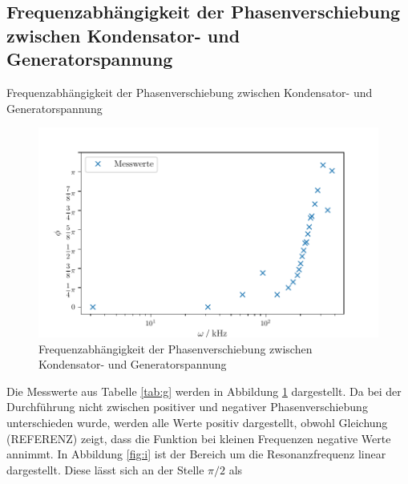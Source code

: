 \subsection{Frequenzabhängigkeit der Phasenverschiebung zwischen Kondensator- und Generatorspannung}

\begin{table}[H]
  \centering
  
  
  \caption{Frequenzabhängigkeit der Phasenverschiebung zwischen Kondensator- und Generatorspannung}
  \label{tab:g}
\end{table}

\begin{figure}[H]
  \centering
  \includegraphics{build/plot4.pdf}
  \caption{Frequenzabhängigkeit der Phasenverschiebung zwischen Kondensator- und Generatorspannung}
  \label{fig:j}
\end{figure}
\noindent Die Messwerte aus Tabelle \ref{tab:g} werden in Abbildung
\ref{fig:j} dargestellt. Da bei der Durchführung nicht zwischen
positiver und negativer Phasenverschiebung unterschieden wurde,
werden alle Werte positiv dargestellt, obwohl Gleichung (REFERENZ)
zeigt, dass die Funktion bei kleinen Frequenzen negative Werte annimmt.
In Abbildung \ref{fig:i} ist
der Bereich um die Resonanzfrequenz linear dargestellt.
Diese lässt sich an der Stelle $\pi/2$ als

